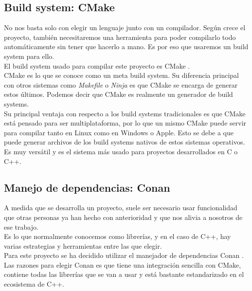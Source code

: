 \subsection{Build system: CMake}

No nos basta solo con elegir un lenguaje junto con un compilador. Según crece el proyecto, también necesitaremos una herramienta para poder compilarlo todo automáticamente sin tener que hacerlo a mano. Es por eso que usaremos un build system para ello.\\

El build system usado para compilar este proyecto es CMake \cite{cmake}.\\

CMake es lo que se conoce como un meta build system. Su diferencia principal con otros sistemas como \textit{Makefile} o \textit{Ninja} es que CMake se encarga de generar estos últimos. Podemos decir que CMake es realmente un generador de build systems.\\

Su principal ventaja con respecto a los build systems tradicionales es que CMake está pensado para ser multiplataforma, por lo que un mismo CMake puede servir para compilar tanto en Linux como en Windows o Apple. Esto se debe a que puede generar archivos de los build systems nativos de estos sistemas operativos.\\

Es muy versátil y es el sistema más usado para proyectos desarrollados en C o C++.

\subsection{Manejo de dependencias: Conan}

A medida que se desarrolla un proyecto, suele ser necesario usar funcionalidad que otras personas ya han hecho con anterioridad y que nos alivia a nosotros de ese trabajo.\\

Es lo que normalmente conocemos como librerías, y en el caso de C++, hay varias estrategias y herramientas entre las que elegir.\\

Para este proyecto se ha decidido utilizar el manejador de dependencias Conan \cite{conan}.\\

Las razones para elegir Conan es que tiene una integración sencilla con CMake, contiene todas las librerías que se van a usar y está bastante estandarizado en el ecosistema de C++.\\


